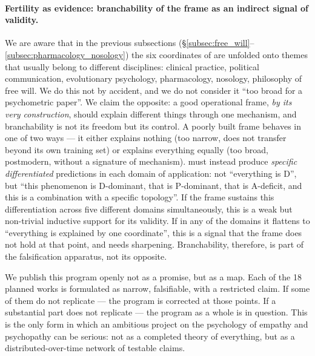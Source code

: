 \paragraph{Fertility as evidence: branchability of the frame as an indirect signal of validity.} We are aware that in the previous subsections (§\ref{subsec:free_will}--\ref{subsec:pharmacology_nosology}) the six coordinates of \DEIC{} are unfolded onto themes that usually belong to different disciplines: clinical practice, political communication, evolutionary psychology, pharmacology, nosology, philosophy of free will. We do this not by accident, and we do not consider it ``too broad for a psychometric paper''. We claim the opposite: a good operational frame, \emph{by its very construction}, should explain different things through one mechanism, and branchability is not its freedom but its control. A poorly built frame behaves in one of two ways --- it either explains nothing (too narrow, does not transfer beyond its own training set) or explains everything equally (too broad, postmodern, without a signature of mechanism). \DEIC{} must instead produce \emph{specific differentiated} predictions in each domain of application: not ``everything is D'', but ``this phenomenon is D-dominant, that is P-dominant, that is A-deficit, and this is a combination with a specific topology''. If the frame sustains this differentiation across five different domains simultaneously, this is a weak but non-trivial inductive support for its validity. If in any of the domains it flattens to ``everything is explained by one coordinate'', this is a signal that the frame does not hold at that point, and needs sharpening. Branchability, therefore, is part of the falsification apparatus, not its opposite.

We publish this program openly not as a promise, but as a map. Each of the 18 planned works is formulated as narrow, falsifiable, with a restricted claim. If some of them do not replicate --- the program is corrected at those points. If a substantial part does not replicate --- the program as a whole is in question. This is the only form in which an ambitious project on the psychology of empathy and psychopathy can be serious: not as a completed theory of everything, but as a distributed-over-time network of testable claims.
